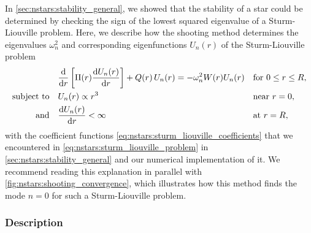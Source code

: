 In \cref{sec:nstars:stability_general}, we showed that the stability of a star could be determined by checking the sign of the lowest squared eigenvalue of a Sturm-Liouville problem.
Here, we describe how the shooting method determines the eigenvalues $\omega_n^2$ and corresponding eigenfunctions $U_n(r)$ of the Sturm-Liouville problem
\begin{subequations}
\begin{align}
	&\odv*{ \left[ \Pi(r) \odv{U_n(r)}{r} \right] }{r} + Q(r) \, U_n(r) = -\omega_n^2 W(r) U_n(r) && \text{for } 0 \leq r \leq R , \label{eq:shooting:sturm_liouville_diffeq} \\
	\text{subject to} \quad & U_n(r)          \propto r^3    && \text{near } r=0 , \label{eq:shooting:sturm_liouville_bc1} \\
	\text{and}        \quad & \odv{U_n(r)}{r} <       \infty && \text{at } r=R , \label{eq:shooting:sturm_liouville_bc2}
\end{align}%
\label{eq:shooting:sturm_liouville_problem}%
\end{subequations}%
with the coefficient functions \eqref{eq:nstars:sturm_liouville_coefficients} that we encountered in \cref{eq:nstars:sturm_liouville_problem} in \cref{sec:nstars:stability_general} and our numerical implementation of it.
We recommend reading this explanation in parallel with \cref{fig:nstars:shooting_convergence}, which illustrates how this method finds the mode $n=0$ for such a Sturm-Liouville problem.

\subsubsection{Description}
\label{sec:numerics:shooting_method_description}

